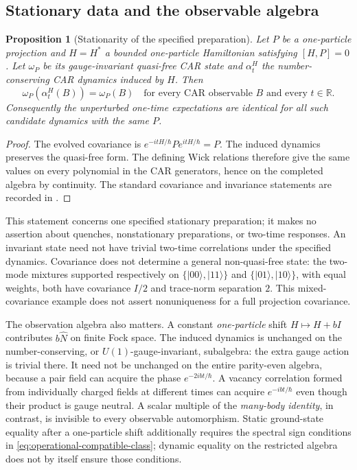 \documentclass[11pt]{article}
\newtheorem{proposition}[theorem]{Proposition}
\theoremstyle{definition}
\begin{document}
\subsection{Stationary data and the observable algebra}

\begin{proposition}[Stationarity of the specified preparation]
\label{prop:operational-stationarity}
Let $P$ be a one-particle projection and $H=H^*$ a bounded one-particle
Hamiltonian satisfying $[H,P]=0$. Let $\omega_P$ be its gauge-invariant
quasi-free CAR state and $\alpha_t^H$ the number-conserving CAR dynamics
induced by $H$. Then
\[
 \omega_P(\alpha_t^H(B))=\omega_P(B)
 \quad\text{for every CAR observable }B\text{ and every }t\in\mathbb R.
\]
Consequently the unperturbed one-time expectations are identical for all
such candidate dynamics with the same $P$.
\end{proposition}
\begin{proof}
The evolved covariance is $e^{-itH/\hbar}Pe^{itH/\hbar}=P$.
The induced dynamics preserves the quasi-free form. The defining Wick
relations therefore give the same values on every polynomial in the CAR
generators, hence on the completed algebra by continuity. The standard
covariance and invariance statements are recorded in
\cite[Definition 3.1, Lemmas 3.3 and 4.2]{araki}.
\end{proof}

This statement concerns one specified stationary preparation; it makes
no assertion about quenches, nonstationary preparations, or two-time
responses. An invariant state need not have trivial two-time correlations
under the specified dynamics. Covariance does not determine a general non-quasi-free state:
the two-mode mixtures supported respectively on
$\{|00\rangle,|11\rangle\}$ and $\{|01\rangle,|10\rangle\}$, with equal
weights, both have covariance $I/2$ and trace-norm separation $2$.
This mixed-covariance example does not assert nonuniqueness for a full
projection covariance.

The observation algebra also matters. A constant \emph{one-particle}
shift $H\mapsto H+bI$ contributes $b\widehat N$ on finite Fock space.
The induced dynamics is unchanged on the number-conserving, or
$U(1)$-gauge-invariant, subalgebra: the extra gauge action is trivial there.
It need not be unchanged on the entire parity-even algebra, because a
pair field can acquire the phase $e^{-2ibt/\hbar}$. A vacancy correlation
formed from individually charged fields at different times can acquire
$e^{-ibt/\hbar}$ even though their product is gauge neutral. A scalar
multiple of the \emph{many-body identity}, in contrast, is invisible to
every observable automorphism. Static ground-state equality after a
one-particle shift additionally requires the spectral sign conditions in
\eqref{eq:operational-compatible-class}; dynamic equality on the restricted
algebra does not by itself ensure those conditions.
\end{document}

